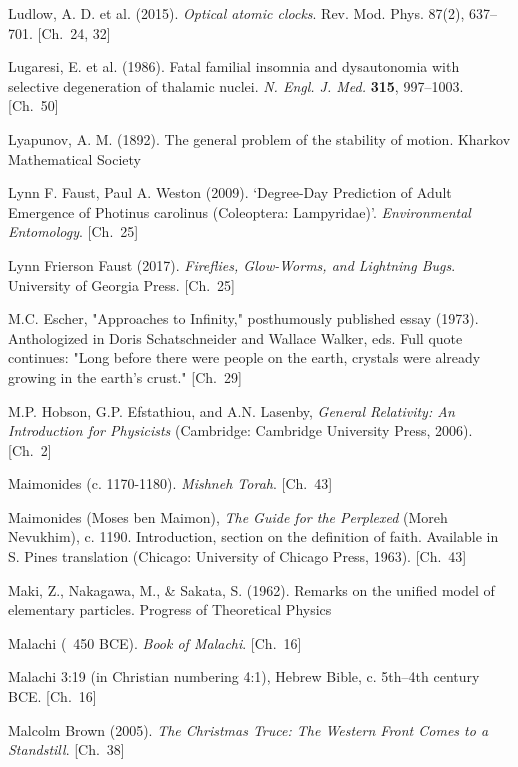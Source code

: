 \begin{list}{}{%
  \setlength{\leftmargin}{2em}%
  \setlength{\itemindent}{-2em}%
  \setlength{\itemsep}{0.35\baselineskip}%
  \setlength{\parsep}{0pt}%
  \setlength{\topsep}{0.5em}}
\item Ludlow, A. D. et al. (2015). \textit{Optical atomic clocks}. Rev. Mod. Phys. 87(2), 637–701. \hfill {\scriptsize [Ch.~24, 32]}
\item Lugaresi, E. et al. (1986). Fatal familial insomnia and dysautonomia with selective degeneration of thalamic nuclei. \textit{N. Engl. J. Med.} \textbf{315}, 997–1003. \hfill {\scriptsize [Ch.~50]}
\item Lyapunov, A. M. (1892). The general problem of the stability of motion. Kharkov Mathematical Society
\item Lynn F. Faust, Paul A. Weston (2009). `Degree-Day Prediction of Adult Emergence of Photinus carolinus (Coleoptera: Lampyridae)'. \textit{Environmental Entomology}. \hfill {\scriptsize [Ch.~25]}
\item Lynn Frierson Faust (2017). \textit{Fireflies, Glow-Worms, and Lightning Bugs}. University of Georgia Press. \hfill {\scriptsize [Ch.~25]}
\item M.C. Escher, "Approaches to Infinity," posthumously published essay (1973). Anthologized in Doris Schatschneider and Wallace Walker, eds. Full quote continues: "Long before there were people on the earth, crystals were already growing in the earth's crust." \hfill {\scriptsize [Ch.~29]}
\item M.P. Hobson, G.P. Efstathiou, and A.N. Lasenby, \textit{General Relativity: An Introduction for Physicists} (Cambridge: Cambridge University Press, 2006). \hfill {\scriptsize [Ch.~2]}
\item Maimonides (c. 1170-1180). \textit{Mishneh Torah}. \hfill {\scriptsize [Ch.~43]}
\item Maimonides (Moses ben Maimon), \textit{The Guide for the Perplexed} (Moreh Nevukhim), c. 1190. Introduction, section on the definition of faith. Available in S. Pines translation (Chicago: University of Chicago Press, 1963). \hfill {\scriptsize [Ch.~43]}
\item Maki, Z., Nakagawa, M., \& Sakata, S. (1962). Remarks on the unified model of elementary particles. Progress of Theoretical Physics
\item Malachi (~450 BCE). \textit{Book of Malachi}. \hfill {\scriptsize [Ch.~16]}
\item Malachi 3:19 (in Christian numbering 4:1), Hebrew Bible, c. 5th–4th century BCE. \hfill {\scriptsize [Ch.~16]}
\item Malcolm Brown (2005). \textit{The Christmas Truce: The Western Front Comes to a Standstill}. \hfill {\scriptsize [Ch.~38]}

\end{list}
